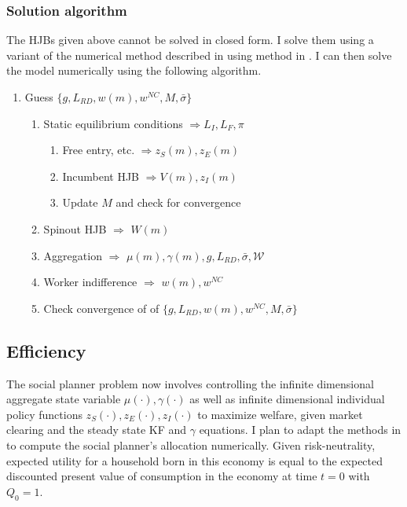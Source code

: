 \documentclass[12pt,english]{article}
\theoremstyle{remark}
\begin{document}
\subsubsection{Solution algorithm}\label{solution_algorithm}

The HJBs given above cannot be solved in closed form. I solve them using a variant of the numerical method described in using method in \cite{achdou_income_2017}. I can then solve the model numerically using the following algorithm.

\begin{enumerate}
	\item Guess $\{g, L_{RD}, w(m), w^{NC}, M, \bar{\sigma} \}$
	\begin{enumerate}
		\item Static equilibrium conditions $\Rightarrow L_I,L_F,\pi$
		\begin{enumerate}
			\item Free entry, etc. $\Rightarrow z_S(m), z_E(m)$
			\item Incumbent HJB $\Rightarrow  V(m),z_I(m)$ 
			\item Update $M$ and check for convergence
		\end{enumerate}
		\item Spinout HJB $\Rightarrow$ $W(m)$
		\item Aggregation $\Rightarrow$ $\mu(m),\gamma(m),g,L_{RD},\bar{\sigma},\mathcal{W}$
		\item Worker indifference $\Rightarrow$ $w(m),w^{NC}$
		\item Check convergence of of $\{g, L_{RD}, w(m), w^{NC}, M, \bar{\sigma} \}$
	\end{enumerate}
\end{enumerate}


\subsection{Efficiency}

The social planner problem now involves controlling the infinite dimensional aggregate state variable $\mu(\cdot), \gamma(\cdot)$ as well as infinite dimensional individual policy functions $z_S(\cdot),z_E(\cdot),z_I(\cdot)$ to maximize welfare, given market clearing and the steady state KF and $\gamma$ equations. I plan to adapt the methods in \cite{nuno_social_2018} to compute the social planner's allocation numerically. Given risk-neutrality, expected utility for a household born in this economy is equal to the expected discounted present value of consumption in the economy at time $t = 0$ with $Q_0 = 1$. 
\end{document}
